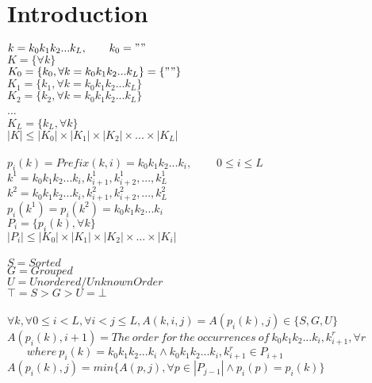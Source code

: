 \documentclass[12pt]{article}
\begin{document}
\maketitle

\section{Introduction}
$k=k_0k_1k_2...k_L,~~~~~~k_0=""$\\
$K=\{\forall k\}$\\
$K_0=\{k_0,\forall k=k_0k_1k_2...k_L\}=\{""\}$\\
$K_1=\{k_1,\forall k=k_0k_1k_2...k_L\}$\\
$K_2=\{k_2,\forall k=k_0k_1k_2...k_L\}$\\
...\\
$K_L=\{k_L,\forall k\}$\\
$|K|\le|K_0|\times|K_1|\times|K_2|\times ... \times|K_L|$\\
\\
$p_i(k)=Prefix(k,i)=k_0k_1k_2...k_i,~~~~~~~~~~0\le i\le L$\\
$k^1=k_0k_1k_2...k_i,k_{i+1}^1,k_{i+2}^1,...,k_L^1$\\
$k^2=k_0k_1k_2...k_i,k_{i+1}^2,k_{i+2}^2,...,k_L^2$\\
$p_i(k^1)=p_i(k^2)=k_0k_1k_2...k_i$\\
$P_i=\{p_i(k), \forall k\}$\\
$|P_i|\le|K_0|\times|K_1|\times|K_2|\times ... \times|K_i|$\\
\\
$S=Sorted$\\
$G=Grouped$\\
$U=Unordered/UnknownOrder$\\
$\top=S>G>U=\bot$\\
\\
$\forall k, \forall 0\le i<L, \forall i<j\le L,A(k,i,j)=A(p_i(k),j)\in \{S,G,U\}$\\
$A(p_i(k),i+1)=The~order~for~the~occurrences~of~k_0k_1k_2...k_i,k_{i+1}^r, \forall r$\\
$~~~~~~~~where~p_i(k)=k_0k_1k_2...k_i \wedge k_0k_1k_2...k_i,k_{i+1}^r\in P_{i+1}$\\
$A(p_i(k),j)=min\{A(p,j), \forall p\in |P_{j-1}| \wedge p_i(p)=p_i(k)\}$\\
\end{document}
